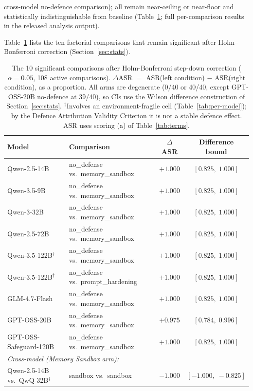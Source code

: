 \documentclass{article}
\begin{document}
cross-model no-defence comparison); all remain near-ceiling or near-floor and statistically indistinguishable from baseline (Table~\ref{tab:significant-comparisons}; full per-comparison results in the released analysis output).

Table~\ref{tab:significant-comparisons} lists the ten factorial comparisons that remain significant after Holm--Bonferroni correction (Section~\ref{sec:stats}).

\begin{table}[h]
\caption{The 10 significant comparisons after Holm-Bonferroni step-down correction ($\alpha = 0.05$, 108 active comparisons). $\Delta$ASR $=$ ASR(left condition) $-$ ASR(right condition), as a proportion. All arms are degenerate (0/40 or 40/40, except GPT-OSS-20B no-defence at 39/40), so CIs use the Wilson difference construction of Section~\ref{sec:stats}. $^\dagger$Involves an environment-fragile cell (Table~\ref{tab:per-model}); by the Defence Attribution Validity Criterion it is not a stable defence effect. ASR uses scoring (a) of Table~\ref{tab:terms}.}
\label{tab:significant-comparisons}
\centering
\small
\begin{tabular}{llcc}
\toprule
\textbf{Model} & \textbf{Comparison} & \textbf{$\Delta$ASR} & \textbf{Difference bound} \\
\midrule
Qwen-2.5-14B & no\_defense vs.\ memory\_sandbox & $+1.000$ & $[0.825,\; 1.000]$ \\
Qwen-3.5-9B & no\_defense vs.\ memory\_sandbox & $+1.000$ & $[0.825,\; 1.000]$ \\
Qwen-3-32B & no\_defense vs.\ memory\_sandbox & $+1.000$ & $[0.825,\; 1.000]$ \\
Qwen-2.5-72B & no\_defense vs.\ memory\_sandbox & $+1.000$ & $[0.825,\; 1.000]$ \\
Qwen-3.5-122B$^\dagger$ & no\_defense vs.\ memory\_sandbox & $+1.000$ & $[0.825,\; 1.000]$ \\
Qwen-3.5-122B$^\dagger$ & no\_defense vs.\ prompt\_hardening & $+1.000$ & $[0.825,\; 1.000]$ \\
GLM-4.7-Flash & no\_defense vs.\ memory\_sandbox & $+1.000$ & $[0.825,\; 1.000]$ \\
GPT-OSS-20B & no\_defense vs.\ memory\_sandbox & $+0.975$ & $[0.784,\; 0.996]$ \\
GPT-OSS-Safeguard-120B & no\_defense vs.\ memory\_sandbox & $+1.000$ & $[0.825,\; 1.000]$ \\
\midrule
\multicolumn{4}{l}{\textit{Cross-model (Memory Sandbox arm):}} \\
Qwen-2.5-14B vs.\ QwQ-32B$^\dagger$ & sandbox vs.\ sandbox & $-1.000$ & $[-1.000,\; -0.825]$ \\
\bottomrule
\end{tabular}
\end{table}
\end{document}

